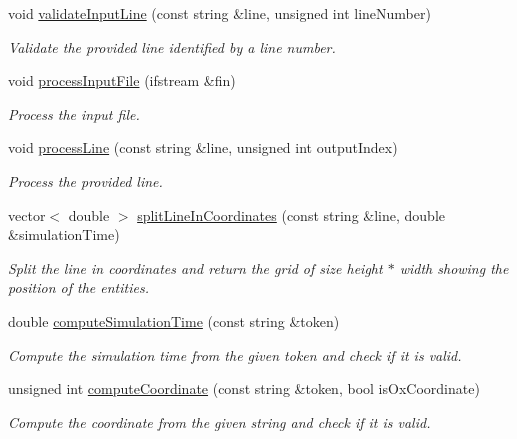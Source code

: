 \begin{DoxyCompactItemize}
void \hyperlink{classmultiscale_1_1video_1_1RectangularEntityCsvToInputFilesConverter_a582115870468210176bedb1f69b244ac}{validate\-Input\-Line} (const string \&line, unsigned int line\-Number)
\begin{DoxyCompactList}\small\item\em Validate the provided line identified by a line number. \end{DoxyCompactList}\item 
void \hyperlink{classmultiscale_1_1video_1_1RectangularEntityCsvToInputFilesConverter_a10ba353be4f381a88d53b9433c3b7e1a}{process\-Input\-File} (ifstream \&fin)
\begin{DoxyCompactList}\small\item\em Process the input file. \end{DoxyCompactList}\item 
void \hyperlink{classmultiscale_1_1video_1_1RectangularEntityCsvToInputFilesConverter_ade459298271cab474b2e9e7bdd583733}{process\-Line} (const string \&line, unsigned int output\-Index)
\begin{DoxyCompactList}\small\item\em Process the provided line. \end{DoxyCompactList}\item 
vector$<$ double $>$ \hyperlink{classmultiscale_1_1video_1_1RectangularEntityCsvToInputFilesConverter_a452c51fa3e5b1357f2f71aa401127087}{split\-Line\-In\-Coordinates} (const string \&line, double \&simulation\-Time)
\begin{DoxyCompactList}\small\item\em Split the line in coordinates and return the grid of size height $\ast$ width showing the position of the entities. \end{DoxyCompactList}\item 
double \hyperlink{classmultiscale_1_1video_1_1RectangularEntityCsvToInputFilesConverter_a8a48052e9b1c1700d15b04f50bf65f2b}{compute\-Simulation\-Time} (const string \&token)
\begin{DoxyCompactList}\small\item\em Compute the simulation time from the given token and check if it is valid. \end{DoxyCompactList}\item 
unsigned int \hyperlink{classmultiscale_1_1video_1_1RectangularEntityCsvToInputFilesConverter_a3defc5af07ae2c1d383c66ab15964b1c}{compute\-Coordinate} (const string \&token, bool is\-Ox\-Coordinate)
\begin{DoxyCompactList}\small\item\em Compute the coordinate from the given string and check if it is valid. \end{DoxyCompactList}\item 

\end{DoxyCompactItemize}
